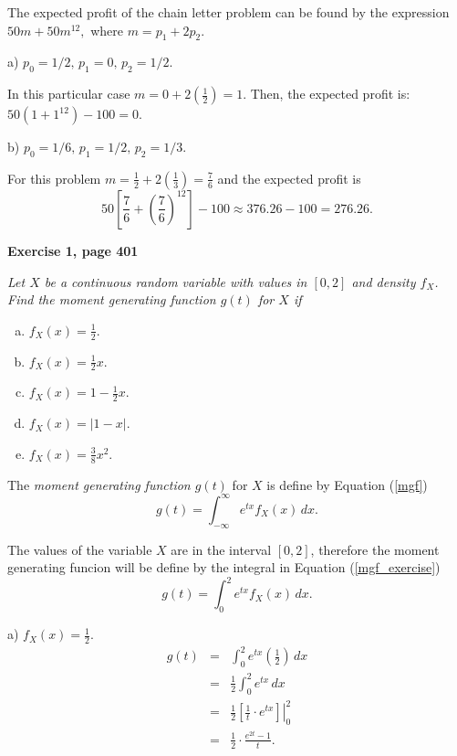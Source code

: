 \documentclass[12pt]{article}
\begin{document}
	The expected profit of the chain letter problem can be found by the expression $50m + 50 m^{12},$ where $m = p_1 + 2p_2$.
	
	\noindent a) $p_0 = 1/2, \, p_1 = 0, \, p_2 = 1/2$.

	In this particular case $m = 0 + 2\left(\frac{1}{2}\right) = 1$. Then, the expected profit is: $50(1+1^{12})-100 =0$.

	\noindent b) $p_0 = 1/6, \, p_1 = 1/2, \, p_2 = 1/3$.
	
	For this problem $m = \frac{1}{2}+ 2\left(\frac{1}{3}\right) = \frac{7}{6}$ and the expected profit is $$50 \left[ \frac{7}{6}+\left(\frac{7}{6} \right)^{12} \right]-100 \approx 376.26 - 100 = 276.26.$$
	
	

	{\bf Exercise 1, page 401}
	
	{\em Let $X$ be a continuous random variable with values in $[0,2]$ and density $f_X$. Find the moment generating function $g(t)$ for $X$ if
		\begin{enumerate}[a)]
			\item $f_X(x) = \frac{1}{2}$.
			\item $f_X (x) = \frac{1}{2}x$.
			\item $f_X (x) = 1 - \frac{1}{2}x$.
			\item $f_X (x) = |1 - x|$.
			\item $f_X (x) = \frac{3}{8}x^2$.
		\end{enumerate}
	}
	
	The {\em moment generating function $g(t)$} for $X$ is define by Equation (\ref{mgf})
	\begin{equation}
	g(t) = \int_{-\infty}^{\infty} e^{tx} f_X(x) \, dx.
	\label{mgf}
	\end{equation}
	
	The values of the variable $X$ are in the interval $[0,2]$, therefore the moment generating funcion will be define by the integral in Equation (\ref{mgf_exercise}) 
	\begin{equation}
		g(t) = \int_{0}^{2} e^{tx} f_X(x) \, dx.
	\label{mgf_exercise}
	\end{equation}
	
	\noindent a) $f_X(x) = \frac{1}{2}$.
	\begin{eqnarray*}
		g(t) &=& \int_{0}^{2} e^{tx} \left(\frac{1}{2}\right)\, dx \\
		&=& \frac{1}{2} \int_{0}^{2} e^{tx} \, dx \\
		&=& \frac{1}{2} \left. \left[ \frac{1}{t} \cdot e^{tx} \right] \right|_{0}^{2} \\
		&=& \frac{1}{2}	\cdot \frac{e^{2t}-1}{t}.
	\end{eqnarray*}
\end{document}

